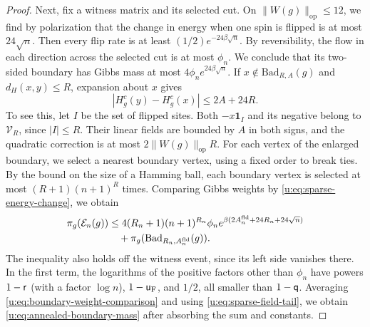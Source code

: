 \begin{proof}
Next, fix a witness matrix and its selected cut. On
$\|W(g)\|_{\mathrm{op}}\le12$, we find by polarization that the change
in energy when one spin is flipped is at most $24\sqrt n$. Then every
flip rate is at least
$(1/2)e^{-24\beta\sqrt n}$. By reversibility, the flow in each direction
across the selected cut is at most $\phi_n$. We conclude that its two-sided
boundary has Gibbs mass at most $4\phi_n e^{24\beta\sqrt n}$.
If $x\notin\mathrm{Bad}_{R,A}(g)$ and $d_H(x,y)\le R$, expansion about
$x$ gives
\begin{equation}\label{u:eq:sparse-energy-change}
 |H^c_g(y)-H^c_g(x)|\le2A+24R.
\end{equation}
To see this, let $I$ be the set of flipped sites. Both $-x\mathbf 1_I$
and its negative belong to $\mathcal V_R$, since $|I|\le R$. Their linear
fields are bounded by $A$ in both signs, and the quadratic correction is
at most $2\|W(g)\|_{\mathrm{op}}R$.
For each vertex of the enlarged boundary, we select a nearest boundary
vertex, using a fixed order to break ties. By the bound on the size of a
Hamming ball, each boundary vertex is selected at most
$(R+1)(n+1)^R$ times. Comparing Gibbs weights by
\eqref{u:eq:sparse-energy-change}, we obtain
\begin{equation}\label{u:eq:boundary-weight-comparison}
 \begin{split}
 \pi_g(\mathcal E_n(g))
 &\le4(R_n+1)(n+1)^{R_n}\phi_n
       e^{\beta(2A_n^{\rm fld}+24R_n+24\sqrt n)}\\
 &\quad+\pi_g(\mathrm{Bad}_{R_n,A_n^{\rm fld}}(g)).
 \end{split}
\end{equation}
The inequality also holds off the witness event, since its left side
vanishes there. In the first term, the logarithms of the positive factors other than
$\phi_n$ have powers $1-\mathsf{r}$ (with a factor $\log n$), $1-\mathsf{u}_{\rm F}$,
and $1/2$, all smaller than $1-\mathsf{q}$. Averaging
\eqref{u:eq:boundary-weight-comparison} and using
\eqref{u:eq:sparse-field-tail}, we obtain
\eqref{u:eq:annealed-boundary-mass} after absorbing the sum and constants.
\end{proof}

